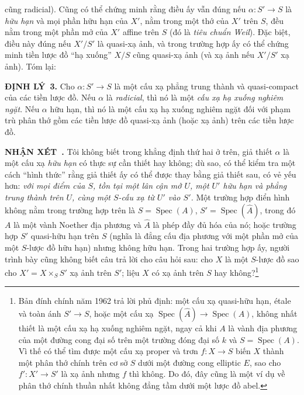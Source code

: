 \documentclass[11pt,twoside,openany]{book}
\numberwithin{equation}{section}
\newcommand{\src}[1]{%
  \phantomsection\hypertarget{src:\fgasourceid:#1}{}%
  \marginpar{\raggedleft\footnotesize\sffamily #1}%
}
\newcommand{\fgasourceid}{unset}
\newcommand{\result}[2]{\par\medskip\noindent\textbf{#1\if\relax\detokenize{#2}\relax\else\ #2\fi.}\quad}
\begin{document}
\src{318}
cũng radicial). Cũng có thể chứng minh rằng điều ấy vẫn đúng nếu
$\alpha:S'\longrightarrow S$ là \emph{hữu hạn} và mọi phần hữu hạn của $X'$,
nằm trong một thớ của $X'$ trên $S$, đều nằm trong một phần mở của $X'$ affine
trên $S$ (đó là \emph{tiêu chuẩn Weil}). Đặc biệt, điều này đúng nếu $X'/S'$ là
quasi-xạ ảnh, và trong trường hợp ấy có thể chứng minh tiền lược đồ ``hạ xuống''
$X/S$ cũng quasi-xạ ảnh (và xạ ảnh nếu $X'/S'$ xạ ảnh). Tóm lại:

\result{ĐỊNH LÝ}{3} Cho $\alpha:S'\longrightarrow S$ là một cấu xạ phẳng trung
thành và quasi-compact của các tiền lược đồ. Nếu $\alpha$ là \emph{radicial},
thì nó là một \emph{cấu xạ hạ xuống nghiêm ngặt}. Nếu $\alpha$ hữu hạn, thì nó
là một cấu xạ hạ xuống nghiêm ngặt đối với phạm trù phân thớ gồm các tiền lược
đồ quasi-xạ ảnh (hoặc xạ ảnh) trên các tiền lược đồ.

\result{NHẬN XÉT}{} Tôi không biết trong khẳng định thứ hai ở trên, giả thiết
$\alpha$ là một cấu xạ \emph{hữu hạn} có thực sự cần thiết hay không; dù sao,
có thể kiểm tra một cách ``hình thức'' rằng giả thiết ấy có thể được thay bằng
giả thiết sau, có vẻ yếu hơn: \emph{với mọi điểm của $S$, tồn tại một lân cận
mở $U$, một $U'$ hữu hạn và phẳng trung thành trên $U$, cùng một $S$-cấu xạ từ
$U'$ vào $S'$.} Một trường hợp điển hình không nằm trong trường hợp trên là
$S=\operatorname{Spec}(A)$, $S'=\operatorname{Spec}(\widehat A)$, trong đó $A$
là một vành Noether địa phương và $\widehat A$ là phép đầy đủ hóa của nó; hoặc
trường hợp $S'$ quasi-hữu hạn trên $S$ (nghĩa là đẳng cấu địa phương với một
phần mở của một $S$-lược đồ hữu hạn) nhưng không hữu hạn. Trong hai trường hợp
ấy, người trình bày cũng không biết câu trả lời cho câu hỏi sau: cho $X$ là một
$S$-lược đồ sao cho $X'=X\times_SS'$ xạ ảnh trên $S'$; liệu $X$ có xạ ảnh trên
$S$ hay không?\footnote{Bản đính chính năm 1962 trả lời phủ định: một cấu xạ
quasi-hữu hạn, étale và toàn ánh $S'\longrightarrow S$, hoặc một cấu xạ
$\operatorname{Spec}(\widehat A)\longrightarrow\operatorname{Spec}(A)$, không
nhất thiết là một cấu xạ hạ xuống nghiêm ngặt, ngay cả khi $A$ là vành địa
phương của một đường cong đại số trên một trường đóng đại số $k$ và
$S=\operatorname{Spec}(A)$. Vì thế có thể tìm được một cấu xạ proper và trơn
$f:X\longrightarrow S$ biến $X$ thành một phân thớ chính trên cơ sở $S$ dưới
một đường cong elliptic $E$, sao cho $f':X'\longrightarrow S'$ là xạ ảnh nhưng
$f$ thì không. Do đó, đây cũng là một ví dụ về phân thớ chính thuần nhất không
đẳng tầm dưới một lược đồ abel.}
\end{document}
